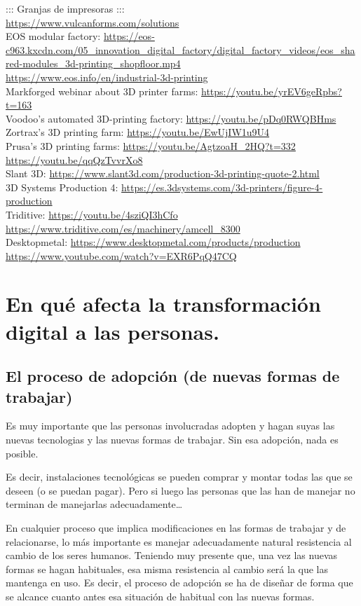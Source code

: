 \documentclass[spanish,12pt,a4paper,final,oneside]{book}
\begin{document}
::: Granjas de impresoras :::
\\ \url{https://www.vulcanforms.com/solutions}
\\ EOS modular factory: \url{https://eos-c963.kxcdn.com/05_innovation_digital_factory/digital_factory_videos/eos_shared-modules_3d-printing_shopfloor.mp4}
\\ \url{https://www.eos.info/en/industrial-3d-printing}
\\ Markforged webinar about 3D printer farms: \url{https://youtu.be/yrEV6geRpbs?t=163}
\\ Voodoo's automated 3D-printing factory: \url{https://youtu.be/pDq0RWQBHms}
\\ Zortrax's 3D printing farm: \url{https://youtu.be/EwUjIW1u9U4}
\\ Prusa's 3D printing farms: \url{https://youtu.be/AgtzoaH_2HQ?t=332} \url{https://youtu.be/qqQzTvvrXo8}
\\ Slant 3D: \url{https://www.slant3d.com/production-3d-printing-quote-2.html}
\\ 3D Systems Production 4: \url{https://es.3dsystems.com/3d-printers/figure-4-production}
\\ Triditive: \url{https://youtu.be/4sziQI3hCfo} 
\\ \url{https://www.triditive.com/es/machinery/amcell_8300}
\\ Desktopmetal: \url{https://www.desktopmetal.com/products/production}
\\ \url{https://www.youtube.com/watch?v=EXR6PqQ47CQ}


\chapter{En qué afecta la transformación digital a las personas.}

\section{El proceso de adopción (de nuevas formas de trabajar)}
Es muy importante que las personas involucradas adopten y hagan suyas las nuevas tecnologias y las nuevas formas de trabajar. Sin esa adopción, nada es posible.

Es decir, instalaciones tecnológicas se pueden comprar y montar todas las que se deseen (o se puedan pagar). Pero si luego las personas que las han de manejar no terminan de manejarlas adecuadamente\ldots 

En cualquier proceso que implica modificaciones en las formas de trabajar y de relacionarse, lo más importante es manejar adecuadamente natural resistencia al cambio de los seres humanos. Teniendo muy presente que, una vez las nuevas formas se hagan habituales, esa misma resistencia al cambio será la que las mantenga en uso. Es decir, el proceso de adopción se ha de diseñar de forma que se alcance cuanto antes esa situación de habitual con las nuevas formas.
\end{document}
